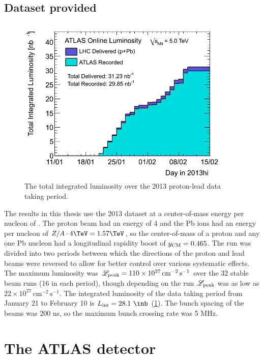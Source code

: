 \subsection{Dataset provided}

\begin{figure}[t]
\includegraphics{sumLumiByDayUrgent.png}
\caption{The total integrated luminosity over the 2013 proton-lead data taking period.}
\label{fig:int_lumi}
\end{figure}

The results in this thesis use the 2013 \lhc \pPb dataset at a center-of-mass energy per nucleon of \pPbenergy.
The proton beam had an energy of 4 \TeV and the Pb ions had an energy per nucleon of $Z/A \cdot 4 \TeV = 1.57 \TeV$, so the center-of-mass of a proton and any one Pb nucleon had a longitudinal rapidity boost of $y_{\mathrm{CM}} = 0.465$.
The \pPb run was divided into two periods between which the directions of the proton and lead beams were reversed to allow for better control over various systematic effects.
The maximum luminosity was $\mathscr{L}_\textrm{peak} = 110 \times 10^{27} \, \textrm{cm}^{-2} \, \textrm{s}^{-1}$ over the 32 stable beam runs (16 in each period), though depending on the run $\mathscr{L}_\textrm{peak}$ was as low as $22 \times 10^{27} \, \textrm{cm}^{-2} \, \textrm{s}^{-1}$.
The integrated luminosity of the data taking period from January 21 to February 10 is $\Lint = 28.1~\inb$ (\cref{fig:int_lumi}).
The bunch spacing of the beams was 200 ns, so the maximum bunch crossing rate was 5 MHz.

\section{The ATLAS detector}
\label{sec:atlas}

